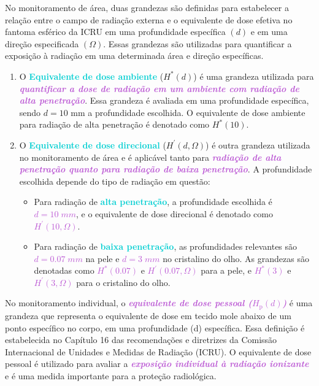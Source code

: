 \documentclass[11pt,a4paper]{article}
\begin{document}
	No monitoramento de área, duas grandezas são definidas para estabelecer a relação entre o campo de radiação externa e o equivalente de dose efetiva no fantoma esférico da ICRU em uma profundidade específica $(d)$ e em uma direção especificada $(\Omega)$. Essas grandezas são utilizadas para quantificar a exposição à radiação em uma determinada área e direção específicas.

	\begin{enumerate}
		\item O \textcolor{DarkTurquoise}{\textbf{Equivalente de dose ambiente}} ($H^{\ast}(d)$) é uma grandeza utilizada para \textcolor{MediumOrchid}{\textit{\textbf{quantificar a dose de radiação em um ambiente com radiação de alta penetração}}}. Essa grandeza é avaliada em uma profundidade específica, sendo $d = 10 \text{ mm}$ a profundidade escolhida. O equivalente de dose ambiente para radiação de alta penetração é denotado como $H^{\ast}(10)$.
		\item O \textcolor{DarkTurquoise}{\textbf{Equivalente de dose direcional}} ($H^{\prime}(d, \Omega)$) é outra grandeza utilizada no monitoramento de área e é aplicável tanto para \textcolor{MediumOrchid}{\textit{\textbf{radiação de alta penetração quanto para radiação de baixa penetração}}}. A profundidade escolhida depende do tipo de radiação em questão:
		\begin{itemize}
			\item Para radiação de \textcolor{DarkTurquoise}{\textbf{alta penetração}}, a profundidade escolhida é \textcolor{MediumOrchid}{\textit{\textbf{$d = 10\; mm$}}}, e o equivalente de dose direcional é denotado como \textcolor{MediumOrchid}{\textit{\textbf{$H^{\prime}(10, \Omega)$}}}.
			\item Para radiação de \textcolor{DarkTurquoise}{\textbf{baixa penetração}}, as profundidades relevantes são \textcolor{MediumOrchid}{\textit{\textbf{$d = 0.07 \;mm$}}} na pele e \textcolor{MediumOrchid}{\textit{\textbf{$d = 3\; mm$}}} no cristalino do olho. As grandezas são denotadas como \textcolor{MediumOrchid}{\textit{\textbf{$H^{\ast}(0.07)$}}} e \textcolor{MediumOrchid}{\textit{\textbf{$H^{\prime}(0.07, \Omega)$}}} para a pele, e \textcolor{MediumOrchid}{\textit{\textbf{$H^{\ast}(3)$}}} e \textcolor{MediumOrchid}{\textit{\textbf{$H^{\prime}(3, \Omega)$}}} para o cristalino do olho.
		\end{itemize}
	\end{enumerate}

	No monitoramento individual, o \textcolor{MediumOrchid}{\textit{\textbf{equivalente de dose pessoal ($H_{\text{p}}(d)$)}}} é uma grandeza que representa o equivalente de dose em tecido mole abaixo de um ponto específico no corpo, em uma profundidade (d) específica. Essa definição é estabelecida no Capítulo 16 das recomendações e diretrizes da Comissão Internacional de Unidades e Medidas de Radiação (ICRU). O equivalente de dose pessoal é utilizado para avaliar a \textcolor{MediumOrchid}{\textit{\textbf{exposição individual à radiação ionizante}}} e é uma medida importante para a proteção radiológica.
\end{document}
